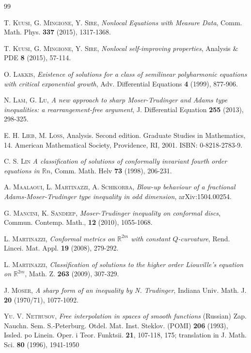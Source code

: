 \documentclass[11pt, a4paper]{article}
\newcommand{\R}{\mathbb{R}}
\begin{document}
\begin{thebibliography}{99}
\begin{small}
 \textsc{T. Kuusi, G. Mingione, Y. Sire}, \emph{Nonlocal Equations with Measure Data}, Comm. Math. Phys. \textbf{337} (2015), 1317-1368.

 \textsc{T. Kuusi, G. Mingione, Y. Sire}, \emph{Nonlocal self-improving properties}, Analysis \& PDE \textbf{8} (2015), 57-114.

 \textsc{O. Lakkis}, \emph{Existence of solutions for a class of semilinear polyharmonic equations with critical exponential growth}, Adv. Differential Equations \textbf{4} (1999), 877-906.

 \textsc{N. Lam, G. Lu}, \emph{A new approach to sharp Moser-Trudinger and Adams type inequalities: a rearrangement-free argument}, J. Differential Equation \textbf{255} (2013), 298-325.

 \textsc{E. H. Lieb, M. Loss}, Analysis. 
Second edition. Graduate Studies in Mathematics, 14.  American Mathematical Society, Providence, RI, 2001. ISBN: 0-8218-2783-9. 

 \textsc{C. S. Lin} \emph{A classification of solutions of conformally invariant fourth order equations in $\R{n}$}, Comm. Math. Helv \textbf{73} (1998), 206-231.

 \textsc{A. Maalaoui, L. Martinazzi, A. Schikorra}, \emph{Blow-up behaviour of a fractional Adams-Moser-Trudinger type inequality in odd dimension}, arXiv:1504.00254.

 \textsc{G. Mancini, K. Sandeep}, \emph{Moser-Trudinger inequality on conformal discs}, Commun. Contemp. Math., \textbf{12} (2010), 1055-1068.

 \textsc{L. Martinazzi},  \emph{Conformal metrics on $\mathbb{R}^{2m}$ with constant $Q$-curvature}, Rend. Lincei. Mat. Appl. \textbf{19} (2008), 279-292.


 \textsc{L. Martinazzi,}  \emph{Classification of solutions to the higher order Liouville's equation on $\mathbb{R}^{2m}$}, Math. Z. \textbf{263} (2009), 307-329.


 \textsc{J. Moser,} \emph{A sharp form of an inequality by N. Trudinger}, Indiana Univ. Math. J. \textbf{20} (1970/71), 1077-1092.

 \textsc{Yu. V. Netrusov,} \emph{Free interpolation in spaces of smooth functions} (Russian) Zap. Nauchn. Sem. S.-Peterburg. Otdel. Mat. Inst. Steklov. (POMI) \textbf{206} (1993), Issled. po Linein. Oper. i Teor. Funktsii. \textbf{21}, 107-118, 175; translation in J. Math. Sci. \textbf{80} (1996), 1941-1950


\end{small}
\end{thebibliography}
\end{document}
